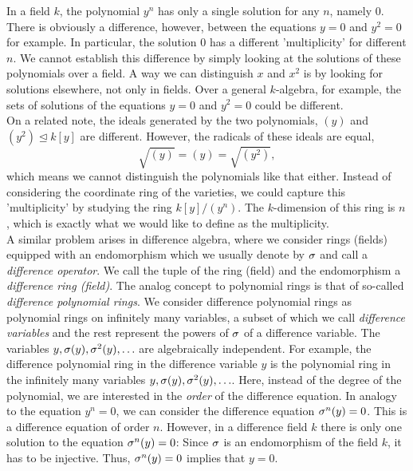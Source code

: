 In a field $k$, the polynomial $y^n$ has only a single solution for any $n$, namely $0$. 
There is obviously a difference, however, between the equations $y = 0$ and $y^2 = 0$ for example. In particular, the solution $0$ has a different 'multiplicity' for different $n$.
We cannot establish this difference by simply looking at the solutions of these polynomials over a field.
  A way we can distinguish $x$ and $x^2$ is by looking for solutions elsewhere, not only in fields.
Over a general $k$-algebra, for example, the sets of solutions of the equations $y = 0$ and $y^2 = 0$ could be different. \\


On a related note, the ideals generated by the two polynomials, $(y)$ and $(y^2) \unlhd k[y]$ are different. However, the radicals of these ideals are equal,
$$ \sqrt{ (y) } = (y) = \sqrt{(y^2)}, $$ which means we cannot distinguish the polynomials like that either.
Instead of considering the coordinate ring of the varieties, we could capture this 'multiplicity' by studying the ring $k[y]/(y^n)$.
The $k$-dimension of this ring is $n$, which is exactly what we would like to define as the multiplicity. \\

A similar problem arises in difference algebra, where we consider rings (fields) equipped with an endomorphism which we usually denote by $\sigma$ and call a \emph{difference operator}. We call the tuple of the ring (field) and the endomorphism a \emph{difference ring (field)}.
The analog concept to polynomial rings is that of so-called \emph{difference polynomial rings}. We consider difference polynomial rings as polynomial rings on infinitely many variables, a subset of which we call \emph{difference variables} and the rest represent the powers of $\sigma$ of a difference variable. The variables $y, \sigma(y), \sigma^2(y), \ldots$ are algebraically independent.
For example, the difference polynomial ring in the difference variable $y$ is the polynomial ring in the infinitely many variables $y, \sigma(y), \sigma^2(y),\ldots$.
Here, instead of the degree of the polynomial, we are interested in the \emph{order} of the difference equation.
In analogy to the equation $y^n = 0$, we can consider the difference equation $\sigma^n(y) = 0$. This is a difference equation of order $n$.
However, in a difference field $k$ there is only one solution to the equation $\sigma^n(y) = 0$: Since $\sigma$ is an endomorphism of the field $k$,
it has to be injective. Thus, $\sigma^n(y) = 0$ implies that $y = 0$. \\

